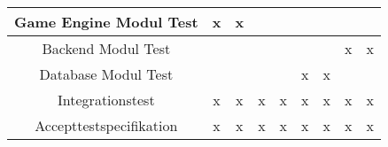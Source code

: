 \begin{center}
\begin{longtable}{|c|c|c|c|c|c|c|c|c|}
    Game Engine Modul Test      & x      & x     &       &        &        &       &       &        \\ \hline
    Backend Modul Test          &        &       &       &        &        &       & x     & x      \\ \hline
    Database Modul Test          &        &       &       &        & x      & x     &       &        \\ \hline
    Integrationstest            & x      & x     & x     & x      & x      & x     & x     & x      \\ \hline
    Accepttestspecifikation     & x      & x     & x     & x      & x      & x     & x     & x      \\ \hline
  \end{longtable}
  \addtocounter{table}{-1}
\end{center}

\newpage
